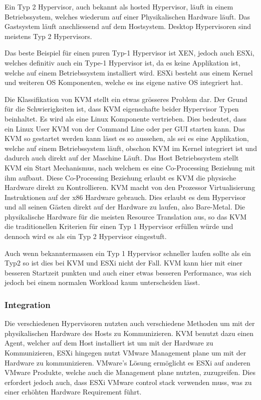 \documentclass[14pt]{extreport}
\begin{document}
Ein Typ 2 Hypervisor, auch bekannt als hosted Hypervisor, läuft in einem Betriebssystem, welches wiederum auf einer Physikalischen Hardware läuft. Das Gastsystem läuft anschliessend auf dem Hostsystem. Desktop Hypervisoren sind meistens Typ 2 Hypervisors.

Das beste Beispiel für einen puren Typ-1 Hypervisor ist XEN, jedoch auch ESXi, welches definitiv auch ein Type-1 Hypervisor ist, da es keine Applikation ist, welche auf einem Betriebssystem installiert wird. ESXi besteht aus einem Kernel und weiteren OS Komponenten, welche es ins eigene native OS integriert hat.

Die Klassifikation von KVM stellt ein etwas grösseres Problem dar. Der Grund für die Schwierigkeiten ist, dass KVM eigenschafte beider Hypervisor Typen beinhaltet. Es wird als eine Linux Komponente vertrieben. Dies bedeutet, dass ein Linux User KVM von der Command Line oder per GUI starten kann. Das KVM so gestartet werden kann lässt es so aussehen, als sei es eine Applikation, welche auf einem Betriebssystem läuft, obschon KVM im Kernel integriert ist und dadurch auch direkt auf der Maschine Läuft.
Das Host Betriebssystem stellt KVM ein Start Mechanismus, nach welchem es eine Co-Processing Beziehung mit ihm aufbaut. Diese Co-Processing Beziehung erlaubt es KVM die physische Hardware direkt zu Kontrollieren. KVM macht von den Prozessor Virtualisierung Instruktionen auf der x86 Hardware gebrauch. Dies erlaubt es dem Hypervisor und all seinen Gästen direkt auf der Hardware zu laufen, also Bare-Metal. Die physikalische Hardware für die meisten Resource Translation aus, so das KVM die traditionellen Kriterien für einen Typ 1 Hypervisor erfüllen würde und dennoch wird es als ein Typ 2 Hypervisor eingestuft.

Auch wenn bekanntermassen ein Typ 1 Hypervisor schneller laufen sollte als ein Typ2 so ist dies bei KVM und ESXi nicht der Fall. KVM kann hier mit einer besseren Startzeit punkten und auch einer etwas besseren Performance, was sich jedoch bei einem normalen Workload kaum unterscheiden lässt. \cite{website:vergleich}

\subsubsection{Integration}
Die verschiedenen Hypervisoren nutzten auch verschiedene Methoden um mit der physikalischen Hardware des Hosts zu Kommunizieren. KVM benutzt dazu einen Agent, welcher auf dem Host installiert ist um mit der Hardware zu Kommunizieren, ESXi hingegen nutzt VMware Management plane um mit der Hardware zu kommunizieren. VMware's Lösung ermöglicht es ESXi auf anderen VMware Produkte, welche auch die Management plane nutzten, zuzugreifen. Dies erfordert jedoch auch, dass ESXi VMware control stack verwenden muss, was zu einer erhöhten Hardware Requirement führt.
\end{document}
